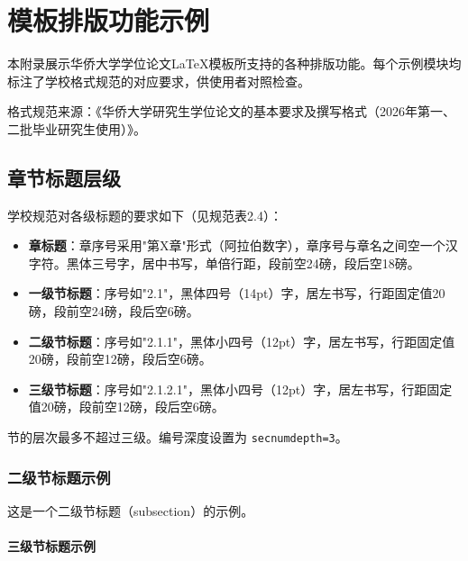 
\chapter{模板排版功能示例}\label{chap:appendix-demo}

本附录展示华侨大学学位论文\LaTeX{}模板所支持的各种排版功能。每个示例模块均标注了学校格式规范的对应要求，供使用者对照检查。

格式规范来源：《华侨大学研究生学位论文的基本要求及撰写格式（2026年第一、二批毕业研究生使用）》。

\section{章节标题层级}\label{sec:demo-sections}

学校规范对各级标题的要求如下（见规范表2.4）：

\begin{itemize}
  \item \textbf{章标题}：章序号采用"第X章"形式（阿拉伯数字），章序号与章名之间空一个汉字符。黑体三号字，居中书写，单倍行距，段前空24磅，段后空18磅。
  \item \textbf{一级节标题}：序号如"2.1"，黑体四号（14pt）字，居左书写，行距固定值20磅，段前空24磅，段后空6磅。
  \item \textbf{二级节标题}：序号如"2.1.1"，黑体小四号（12pt）字，居左书写，行距固定值20磅，段前空12磅，段后空6磅。
  \item \textbf{三级节标题}：序号如"2.1.2.1"，黑体小四号（12pt）字，居左书写，行距固定值20磅，段前空12磅，段后空6磅。
\end{itemize}

节的层次最多不超过三级。编号深度设置为 \verb|secnumdepth=3|。

\subsection{二级节标题示例}\label{subsec:demo-subsection}

这是一个二级节标题（subsection）的示例。

\subsubsection{三级节标题示例}\label{subsubsec:demo-subsubsection}

